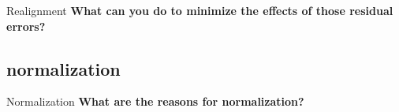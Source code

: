 \documentclass{beamer}
\begin{document}
\begin{frame}{Realignment}
  \textbf{What can you do to minimize the effects of those residual errors?}

\end{frame}


\subsection[normalization]{normalization}

\begin{frame}{Normalization}
  \textbf{What are the reasons for normalization?}

\end{frame}

%


\end{document}
